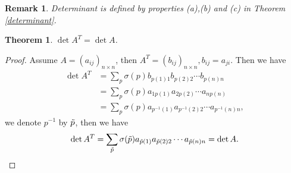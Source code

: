 \documentclass[11pt]{book}
\newtheorem{theorem}{Theorem}[chapter]
\newtheorem{remark}{Remark}[chapter]
\theoremstyle{definition}
\numberwithin{equation}{chapter}
\begin{document}
\begin{remark}
Determinant is defined by properties (a),(b) and (c) in Theorem \ref{determinant}.
\end{remark}

\medskip

\begin{theorem}
$\det A^T = \det A$.
\end{theorem}
\begin{proof}
Assume $A = (a_{ij})_{n\times n}$, then $A^T = (b_{ij})_{n\times n}, b_{ij} = a_{ji}$. Then we have 
\begin{align*}
    \det A^T & = \sum_p \sigma(p) b_{p(1)1} b_{p(2)2} \cdots b_{p(n)n} \\
    & = \sum_p \sigma(p) a_{1 p(1)} a_{2 p(2)} \cdots a_{n p(n)} \\
    & = \sum_p \sigma(p) a_{p^{-1}(1)} a_{p^{-1}(2) 2} \cdots a_{p^{-1}(n) n},
\end{align*}
we denote $p^{-1}$ by $\Tilde{p}$, then we have
\begin{align*}
    \det A^T = \sum_{\Tilde{p}} \sigma(\Tilde{p}) a_{\Tilde{p}(1)} a_{\Tilde{p}(2) 2} \cdots a_{\Tilde{p}(n) n} = \det A.
\end{align*}
\end{proof}

\medskip
\end{document}
